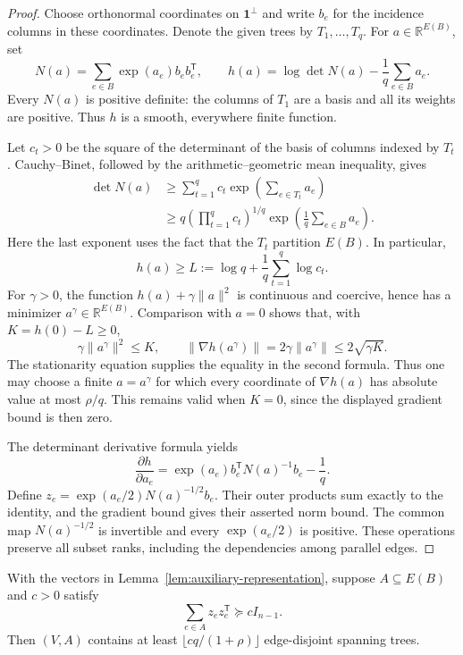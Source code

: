 \begin{proof}
Choose orthonormal coordinates on $\mathbf1^\perp$ and write $b_e$ for
the incidence columns in these coordinates.  Denote the given trees by
$T_1,\ldots,T_q$.  For $a\in\mathbb R^{E(B)}$, set
\[
 N(a)=\sum_{e\in B}\exp(a_e)b_eb_e^{\mathsf T},
 \qquad
 h(a)=\log\det N(a)-\frac1q\sum_{e\in B}a_e.
\]
Every $N(a)$ is positive definite: the columns of $T_1$ are a basis and
all its weights are positive.  Thus $h$ is a smooth, everywhere finite
function.

Let $c_t>0$ be the square of the determinant of the basis of columns
indexed by $T_t$.  Cauchy--Binet, followed by the arithmetic--geometric
mean inequality, gives
\begin{align*}
 \det N(a)
 &\geq\sum_{t=1}^q c_t\exp\left(\sum_{e\in T_t}a_e\right)\\
 &\geq q\left(\prod_{t=1}^q c_t\right)^{1/q}
       \exp\left(\frac1q\sum_{e\in B}a_e\right).
\end{align*}
Here the last exponent uses the fact that the $T_t$ partition $E(B)$.
In particular,
\[
 h(a)\geq L:=\log q+\frac1q\sum_{t=1}^q\log c_t.
\]
For $\gamma>0$, the function $h(a)+\gamma\|a\|^2$ is continuous and
coercive, hence has a minimizer $a^\gamma\in\mathbb R^{E(B)}$.
Comparison with $a=0$ shows that, with $K=h(0)-L\geq0$,
\[
 \gamma\|a^\gamma\|^2\leq K,
 \qquad
 \|\nabla h(a^\gamma)\|
 =2\gamma\|a^\gamma\|\leq2\sqrt{\gamma K}.
\]
The stationarity equation supplies the equality in the second formula.
Thus one may choose a finite $a=a^\gamma$ for which every coordinate of
$\nabla h(a)$ has absolute value at most $\rho/q$.  This remains valid
when $K=0$, since the displayed gradient bound is then zero.

The determinant derivative formula yields
\[
 \frac{\partial h}{\partial a_e}
 =\exp(a_e)b_e^{\mathsf T}N(a)^{-1}b_e-\frac1q.
\]
Define $z_e=\exp(a_e/2)N(a)^{-1/2}b_e$.  Their outer products sum
exactly to the identity, and the gradient bound gives their asserted
norm bound.  The common map $N(a)^{-1/2}$ is invertible and every
$\exp(a_e/2)$ is positive.  These operations preserve all subset ranks,
including the dependencies among parallel edges.
\end{proof}

\begin{lemma}
\label{lem:projected-trace-packing}
With the vectors in Lemma~\ref{lem:auxiliary-representation}, suppose
$A\subseteq E(B)$ and $c>0$ satisfy
\[
 \sum_{e\in A}z_ez_e^{\mathsf T}\succeq cI_{n-1}.
\]
Then $(V,A)$ contains at least
$\lfloor cq/(1+\rho)\rfloor$ edge-disjoint spanning trees.
\end{lemma}

